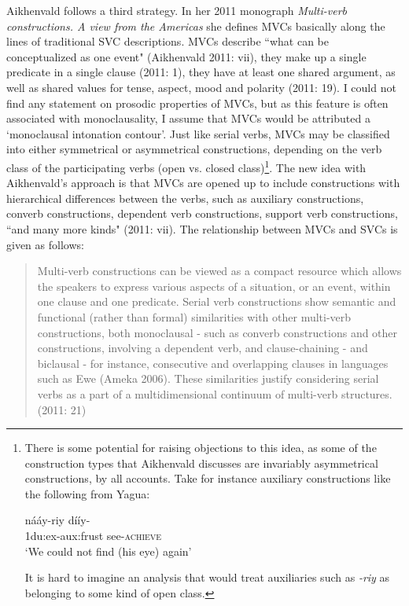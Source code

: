 Aikhenvald follows a third strategy. In her 2011 monograph \textit{Multi-verb constructions. A view from the Americas} she defines MVCs basically along the lines of traditional SVC descriptions. MVCs describe ``what can be conceptualized as one event" (Aikhenvald 2011: vii), they make up a single predicate in a single clause (2011: 1), they have at least one shared argument, as well as shared values for tense, aspect, mood and polarity (2011: 19). I could not find any statement on prosodic properties of MVCs, but as this feature is often associated with monoclausality, I assume that MVCs would be attributed a `monoclausal intonation contour'. Just like serial verbs, MVCs may be classified into either symmetrical or asymmetrical constructions, depending on the verb class of the participating verbs (open vs. closed class)\footnote{There is some potential for raising objections to this idea, as some of the construction types that Aikhenvald discusses are invariably asymmetrical constructions, by all accounts. Take for instance auxiliary constructions like the following from Yagua:

\ea \label{}
\gll nááy-riy dííy- \\
\acs{1}\acs{du}:\acs{ex}-\acs{aux}:\acs{frust} see-\textsc{achieve} \\
\glft `We could not find (his eye) again' \\ 
\z
\xe

It is hard to imagine an analysis that would treat auxiliaries such as \textit{-riy} as belonging to some kind of open class.}. The new idea with Aikhenvald's approach is that MVCs are opened up to include constructions with hierarchical differences between the verbs, such as auxiliary constructions, converb constructions, dependent verb constructions, support verb constructions, ``and many more kinds" (2011: vii). The relationship between MVCs and SVCs is given as follows:

\begin{quote}Multi-verb constructions can be viewed as a compact resource which allows the speakers to express various aspects of a situation, or an event, within one clause and one predicate. Serial verb constructions show semantic and functional (rather than formal) similarities with other multi-verb constructions, both monoclausal - such as converb constructions and other constructions, involving a dependent verb, and clause-chaining - and biclausal - for instance, consecutive and overlapping clauses in languages such as Ewe (Ameka 2006). These similarities justify considering serial verbs as a part of a multidimensional continuum of multi-verb structures. (2011: 21)\end{quote}

